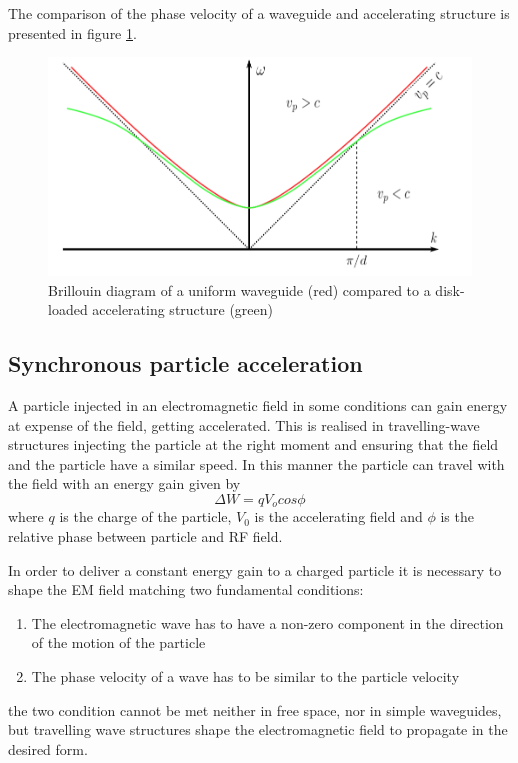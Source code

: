 The comparison of the phase velocity of a waveguide and accelerating structure is presented in figure \ref{vp_fig}.



\begin{figure}[h]
\centering

\includegraphics[scale=0.4]{pictures/vp}
\caption{Brillouin diagram of a uniform waveguide (red) compared to a disk-loaded accelerating structure (green) \cite{Kovermann:1330346}}
\label{vp_fig}

\end{figure}




\subsection[Synchronous particle acceleration]{Synchronous particle acceleration}

A particle injected in an electromagnetic field in some conditions can gain energy at expense of the field, getting accelerated. This is realised in travelling-wave structures injecting the particle at the right moment and ensuring that the field and the particle have a similar speed. In this manner the particle can travel with the field with an energy gain given by
\begin{equation}
\Delta W = q V_o cos \phi
\end{equation}
where $q$ is the charge of the particle, $V_0$ is the accelerating field and $\phi$ is the relative phase between particle and RF field.

In order to deliver a  constant energy gain to a charged particle it is necessary to shape the EM field matching  two fundamental conditions:

\begin{enumerate}
\item The electromagnetic wave has to have a non-zero component in the direction of the motion of the particle
\item The phase velocity of a wave has to be similar to the particle velocity
\end{enumerate}
the two condition cannot be met neither in free space, nor in simple waveguides, but travelling wave structures shape the electromagnetic field to propagate in the desired form.


